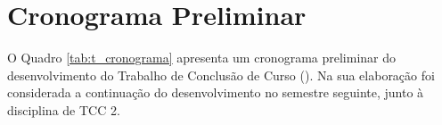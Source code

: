 \chapter{Cronograma Preliminar} \label{cap:viabi}

\vspace{-2cm}
O Quadro \ref{tab:t_cronograma} apresenta um cronograma preliminar do desenvolvimento do Trabalho de Conclusão 
de Curso (). 
Na sua elaboração foi considerada a continuação do desenvolvimento
no semestre seguinte, junto à disciplina de TCC 2.

\vspace{1.5cm}


